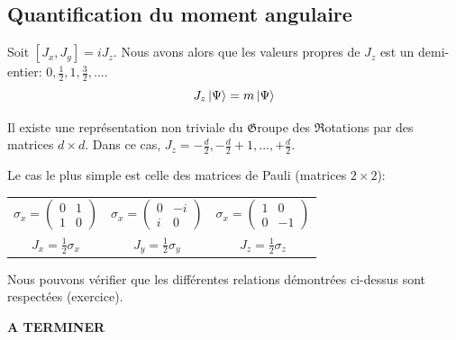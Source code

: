 \documentclass[../notesdecours.tex]{subfiles}
\begin{document}
\subsection{Quantification du moment angulaire}
\begin{theorem}
Soit $[J_x,J_y] = iJ_z$. Nous avons alors que les valeurs propres de $J_z$ est un demi-entier: $0,\frac{1}{2}, 1, \frac{3}{2}, ...$.
\begin{equation*}
J_z \ket{\Psi} = m\ket{\Psi}
\end{equation*}
\end{theorem}
\begin{theorem}
Il existe une représentation non triviale du $\mathfrak{G}$roupe des $\mathfrak{R}$otations par des matrices $d\times d$. Dans ce cas, $J_z = -\frac{d}{2}, -\frac{d}{2}+1,...,+\frac{d}{2}$.
\end{theorem}
\begin{exemple}
Le cas le plus simple est celle des matrices de Pauli (matrices $2\times 2$):
\begin{center}
\begin{tabular}{c|c|c}
$\sigma_x = \begin{pmatrix}
0 & 1\\
1 & 0
\end{pmatrix}$ & $\sigma_x = \begin{pmatrix}
0 & -i\\
i & 0
\end{pmatrix}$ & $\sigma_x = \begin{pmatrix}
1 & 0\\
0 & -1
\end{pmatrix}$\\
$J_x = \frac{1}{2}\sigma_x$ & $J_y = \frac{1}{2}\sigma_y$ & $J_z = \frac{1}{2}\sigma_z$
\end{tabular}
\end{center}
Nous pouvons vérifier que les différentes relations démontrées ci-dessus sont respectées (exercice).
\end{exemple}

\color{red}
\textbf{A TERMINER}
\end{document}
